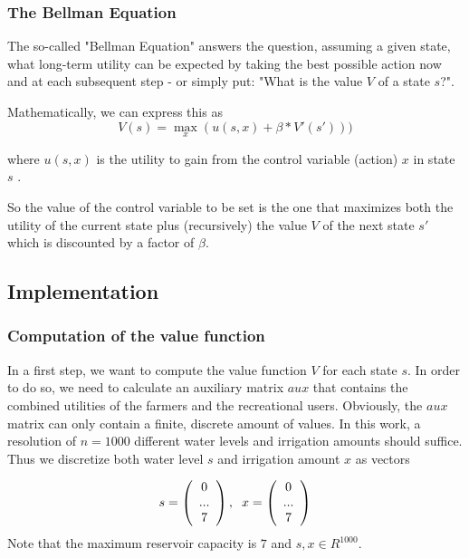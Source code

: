 \documentclass[12pt, a4paper, oneside]{article}
\begin{document}
\subsubsection{The Bellman Equation}

The so-called "Bellman Equation" answers the question, assuming a given state, what long-term utility can be expected by taking the best possible action now and at each subsequent step - or simply put: "What is the value $V$ of a state $s$?". 

Mathematically, we can express this as  
\begin{equation}
V(s) = \max_{x}(u(s,x) + \beta*V'(s')))
\end{equation}

where $u(s,x)$ is the utility to gain from the control variable (action) $x$ in state $s$ \citep{seminar:week3}. 

So the value of the control variable to be set is the one that maximizes both the utility of the current state plus (recursively) the value $V$ of the next state $s'$ which is discounted by a factor of $\beta$. 
\subsection{Implementation}
\subsubsection{Computation of the value function}

In a first step, we want to compute the value function $V$ for each state $s$. 
In order to do so, we need to calculate an auxiliary matrix $aux$ that contains the combined utilities of the farmers and the recreational users. 
Obviously, the $aux$ matrix can only contain a finite, discrete amount of values. In this work, a resolution of $n = 1000$ different water levels and irrigation amounts should suffice. 
Thus we discretize both water level $s$ and irrigation amount $x$ as vectors

	\begin{equation}
s = \left( \begin{array}{c}0\\...\\7\end{array}\right),\hspace{2mm}x = \left( \begin{array}{c}0\\...\\7\end{array}\right)
\end{equation}
Note that the maximum reservoir capacity is $7$ and $s, x \in R^{1000}$. 
\end{document}
